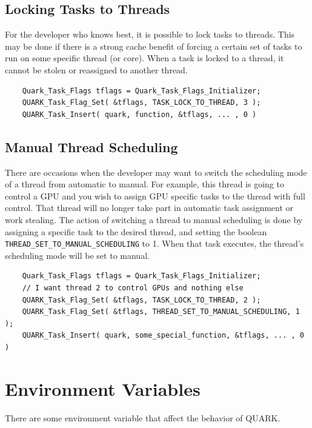 \documentclass[11pt,letterpaper]{report}
\begin{document}
\subsection{Locking Tasks to Threads}
For the developer who knows best, it is possible to lock tasks to
threads. This may be done if there is a strong cache benefit of forcing
a certain set of tasks to run on some specific thread (or core).  When
a task is locked to a thread, it cannot be stolen or reassigned to
another thread.
\begin{samepage}
\begin{lstlisting}
    Quark_Task_Flags tflags = Quark_Task_Flags_Initializer;
    QUARK_Task_Flag_Set( &tflags, TASK_LOCK_TO_THREAD, 3 );
    QUARK_Task_Insert( quark, function, &tflags, ... , 0 )
\end{lstlisting}
\end{samepage}


\subsection{Manual Thread Scheduling}
There are occasions when the developer may want to switch the
scheduling mode of a thread from automatic to manual.  For example,
this thread is going to control a GPU and you wish to assign GPU
specific tasks to the thread with full control.  That thread will no
longer take part in automatic task assignment or work stealing.  The
action of switching a thread to manual scheduling is done by assigning
a specific task to the desired thread, and setting the boolean
\verb|THREAD_SET_TO_MANUAL_SCHEDULING| to 1.  When that task executes,
the thread's scheduling mode will be set to manual.
\begin{samepage}
\begin{lstlisting}
    Quark_Task_Flags tflags = Quark_Task_Flags_Initializer;
    // I want thread 2 to control GPUs and nothing else
    QUARK_Task_Flag_Set( &tflags, TASK_LOCK_TO_THREAD, 2 );
    QUARK_Task_Flag_Set( &tflags, THREAD_SET_TO_MANUAL_SCHEDULING, 1 );
    QUARK_Task_Insert( quark, some_special_function, &tflags, ... , 0 )
\end{lstlisting}
\end{samepage}

\section{Environment Variables}

There are some environment variable that affect the behavior of
QUARK.
\end{document}

